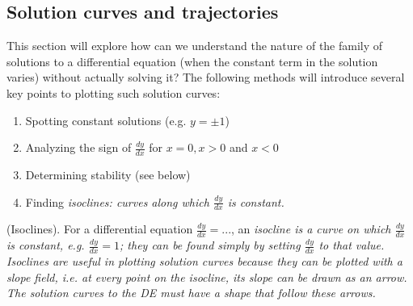 \documentclass{article}
\begin{document}
\subsection{Solution curves and trajectories}
This section will explore how can we understand the nature of the family of solutions to a differential equation (when the constant term in the solution varies) without actually solving it? The following methods will introduce several key points to plotting such solution curves:
\begin{enumerate}
    \item Spotting constant solutions (e.g. $y = \pm 1$)
    \item Analyzing the sign of $\frac{dy}{dx}$ for $x=0, x>0$ and $x<0$
    \item Determining stability (see below)
    \item Finding \it isoclines: \normalfont curves along which $\frac{dy}{dx}$ is constant.
\end{enumerate}
\begin{method}
    (Isoclines). For a differential equation $\frac{dy}{dx} = ...$, an \it isocline \normalfont is a curve on which $\frac{dy}{dx}$ is constant, e.g. $\frac{dy}{dx} = 1$; they can be found simply by setting $\frac{dy}{dx}$ to that value. Isoclines are useful in plotting solution curves because they can be plotted with a slope field, i.e. at every point on the isocline, its slope can be drawn as an arrow. The solution curves to the DE must have a shape that follow these arrows.
\end{method}
\end{document}
